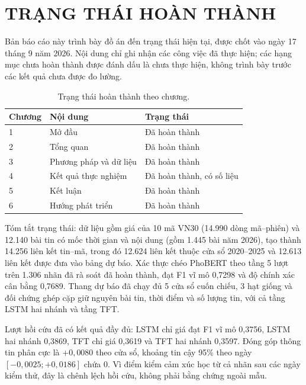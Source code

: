 \chapter*{TRẠNG THÁI HOÀN THÀNH}

Bản báo cáo này trình bày đồ án đến trạng thái hiện tại, được chốt vào ngày 17
tháng 9 năm 2026. Nội dung chỉ ghi nhận các công việc đã thực hiện; các hạng mục
chưa hoàn thành được đánh dấu là chưa thực hiện, không trình bày trước các kết quả
chưa được đo lường.

\begin{table}[H]
  \centering
  \caption{Trạng thái hoàn thành theo chương.}
  \begin{tabular}{p{1.6cm} p{7.5cm} p{3.4cm}}
    \toprule
    Chương & Nội dung & Trạng thái \\
    \midrule
    1 & Mở đầu & Đã hoàn thành \\
    2 & Tổng quan & Đã hoàn thành \\
    3 & Phương pháp và dữ liệu & Đã hoàn thành \\
    4 & Kết quả thực nghiệm & Đã hoàn thành, có số liệu \\
    5 & Kết luận & Đã hoàn thành \\
    6 & Hướng phát triển & Đã hoàn thành \\
    \bottomrule
  \end{tabular}
\end{table}

\noindent Tóm tắt trạng thái: dữ liệu gồm giá của 10 mã VN30 (14.990 dòng mã--phiên) và
12.140 bài tin có mốc thời gian và nội dung (gồm 1.445 bài năm 2026),
tạo thành 14.256 liên kết tin--mã, trong đó 12.624 liên kết thuộc cửa sổ 2020--2025 và
12.613 liên kết được đưa vào bảng dự báo. Xác thực chéo PhoBERT theo tầng 5 lượt trên
1.306 nhãn đã rà soát đã hoàn thành, đạt F1 vĩ mô 0,7298 và độ chính xác cân bằng 0,7689.
Thang dự báo đã chạy đủ 5 cửa sổ cuốn chiếu, 3 hạt giống và đối chứng ghép cặp giữ nguyên
bài tin, thời điểm và số lượng tin, với cả tầng LSTM hai nhánh và tầng TFT.

\noindent Lượt hồi cứu đã có kết quả đầy đủ: LSTM chỉ giá đạt F1 vĩ mô 0,3756, LSTM hai
nhánh 0,3869, TFT chỉ giá 0,3619 và TFT hai nhánh 0,3597. Đóng góp thông tin phân cực là
$+0{,}0080$ theo cửa sổ, khoảng tin cậy 95\% theo ngày
$[-0{,}0025; +0{,}0186]$ chứa 0. Vì điểm kiểm cảm xúc học từ cả nhãn sau các ngày kiểm
thử, đây là chênh lệch hồi cứu, không phải bằng chứng ngoài mẫu.

